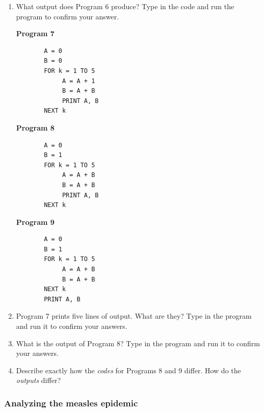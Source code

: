\begin{enumerate}
\item What output does Program 6 produce?  Type in the code and run the
program to confirm your answer.


\begin{center}
\begin{description}
\item[\textbf{Program 7}]

\begin{verbatim}
  A = 0
  B = 0
  FOR k = 1 TO 5
       A = A + 1
       B = A + B
       PRINT A, B
  NEXT k
\end{verbatim}

\item[\textbf{Program 8}]

\begin{verbatim}
  A = 0
  B = 1
  FOR k = 1 TO 5
       A = A + B
       B = A + B
       PRINT A, B
  NEXT k
\end{verbatim}

\item[\textbf{Program 9}]

\begin{verbatim}
  A = 0
  B = 1
  FOR k = 1 TO 5
       A = A + B
       B = A + B
  NEXT k
  PRINT A, B
\end{verbatim}

\end{description}
\end{center}


\item Program 7 prints five lines of output.  What are they?  Type in
the program and run it to confirm your answers.


\item What is the output of Program 8?  Type in the program and run it
to confirm your answers.


\item Describe exactly how the {\em codes\/} for Programs 8 and 9
differ.  How do the {\em outputs\/} differ?


\end{enumerate}
\subsubsection{Analyzing the measles epidemic}
\label{subsubsec:analyzing-the-measles-epidemic}




